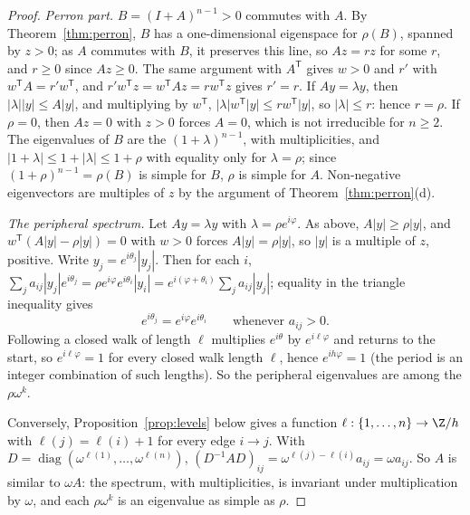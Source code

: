 \begin{proof}
\emph{Perron part.} $B=(I+A)^{n-1}>0$ commutes with $A$. By Theorem~\ref{thm:perron}, $B$ has a one-dimensional eigenspace for
$\rho(B)$, spanned by $z>0$; as $A$ commutes with $B$, it preserves this line, so $Az=rz$ for some $r$, and $r\ge0$ since $Az\ge0$.
The same argument with $A^{\mathsf T}$ gives $w>0$ and $r'$ with $w^{\mathsf T}A=r'w^{\mathsf T}$, and $r'w^{\mathsf T}z=w^{\mathsf
T}Az=rw^{\mathsf T}z$ gives $r'=r$. If $Ay=\lambda y$, then $|\lambda||y|\le A|y|$, and multiplying by $w^{\mathsf T}$,
$|\lambda|w^{\mathsf T}|y|\le rw^{\mathsf T}|y|$, so $|\lambda|\le r$: hence $r=\rho$. If $\rho=0$, then $Az=0$ with $z>0$
forces $A=0$, which is not irreducible for $n\ge2$. The eigenvalues of $B$ are the $(1+\lambda)^{n-1}$, with multiplicities,
and $|1+\lambda|\le1+|\lambda|\le1+\rho$ with equality only for $\lambda=\rho$; since $(1+\rho)^{n-1}=\rho(B)$ is simple for $B$,
$\rho$ is simple for $A$. Non-negative eigenvectors are multiples of $z$ by the argument of Theorem~\ref{thm:perron}(d).

\emph{The peripheral spectrum.} Let $Ay=\lambda y$ with $\lambda=\rho e^{i\varphi}$. As above, $A|y|\ge\rho|y|$, and
$w^{\mathsf T}(A|y|-\rho|y|)=0$ with $w>0$ forces $A|y|=\rho|y|$, so $|y|$ is a multiple of $z$, positive. Write $y_j=e^{i\theta_j}
|y_j|$. Then for each $i$, $\sum_ja_{ij}|y_j|e^{i\theta_j}=\rho e^{i\varphi}e^{i\theta_i}|y_i|=e^{i(\varphi+\theta_i)}\sum_ja_{ij}|y_j|$;
equality in the triangle inequality gives
\[
e^{i\theta_j}=e^{i\varphi}e^{i\theta_i}\qquad\text{whenever }a_{ij}>0.
\]
Following a closed walk of length $\ell$ multiplies $e^{i\theta}$ by $e^{i\ell\varphi}$ and returns to the start, so $e^{i\ell
\varphi}=1$ for every closed walk length $\ell$, hence $e^{ih\varphi}=1$ (the period is an integer combination of such lengths).
So the peripheral eigenvalues are among the $\rho\omega^k$.

Conversely, Proposition~\ref{prop:levels} below gives a function $\ell:\{1,\dots,n\}\to\Z/h$ with $\ell(j)=\ell(i)+1$ for every
edge $i\to j$. With $D=\operatorname{diag}(\omega^{\ell(1)},\dots,\omega^{\ell(n)})$, $(D^{-1}AD)_{ij}=\omega^{\ell(j)-\ell(i)}a_{ij}=
\omega a_{ij}$. So $A$ is similar to $\omega A$: the spectrum, with multiplicities, is invariant under multiplication by $\omega$,
and each $\rho\omega^k$ is an eigenvalue as simple as $\rho$.
\end{proof}

